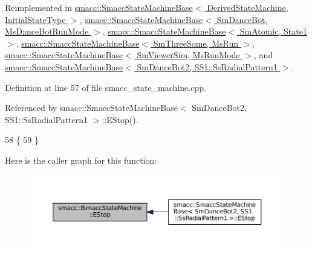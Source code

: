 Reimplemented in \hyperlink{structsmacc_1_1SmaccStateMachineBase_af1d145820c98089389e7de97a6744231}{smacc\+::\+Smacc\+State\+Machine\+Base$<$ Derived\+State\+Machine, Initial\+State\+Type $>$}, \hyperlink{structsmacc_1_1SmaccStateMachineBase_af1d145820c98089389e7de97a6744231}{smacc\+::\+Smacc\+State\+Machine\+Base$<$ Sm\+Dance\+Bot, Ms\+Dance\+Bot\+Run\+Mode $>$}, \hyperlink{structsmacc_1_1SmaccStateMachineBase_af1d145820c98089389e7de97a6744231}{smacc\+::\+Smacc\+State\+Machine\+Base$<$ Sm\+Atomic, State1 $>$}, \hyperlink{structsmacc_1_1SmaccStateMachineBase_af1d145820c98089389e7de97a6744231}{smacc\+::\+Smacc\+State\+Machine\+Base$<$ Sm\+Three\+Some, Ms\+Run $>$}, \hyperlink{structsmacc_1_1SmaccStateMachineBase_af1d145820c98089389e7de97a6744231}{smacc\+::\+Smacc\+State\+Machine\+Base$<$ Sm\+Viewer\+Sim, Ms\+Run\+Mode $>$}, and \hyperlink{structsmacc_1_1SmaccStateMachineBase_af1d145820c98089389e7de97a6744231}{smacc\+::\+Smacc\+State\+Machine\+Base$<$ Sm\+Dance\+Bot2, S\+S1\+::\+Ss\+Radial\+Pattern1 $>$}.



Definition at line 57 of file smacc\+\_\+state\+\_\+machine.\+cpp.



Referenced by smacc\+::\+Smacc\+State\+Machine\+Base$<$ Sm\+Dance\+Bot2, S\+S1\+::\+Ss\+Radial\+Pattern1 $>$\+::\+E\+Stop().


\begin{DoxyCode}
58 \{
59 \}
\end{DoxyCode}


Here is the caller graph for this function\+:
\nopagebreak
\begin{figure}[H]
\begin{center}
\leavevmode
\includegraphics[width=350pt]{classsmacc_1_1ISmaccStateMachine_a3c5aab001d1bb7edcb37413404e4a7c2_icgraph}
\end{center}
\end{figure}


